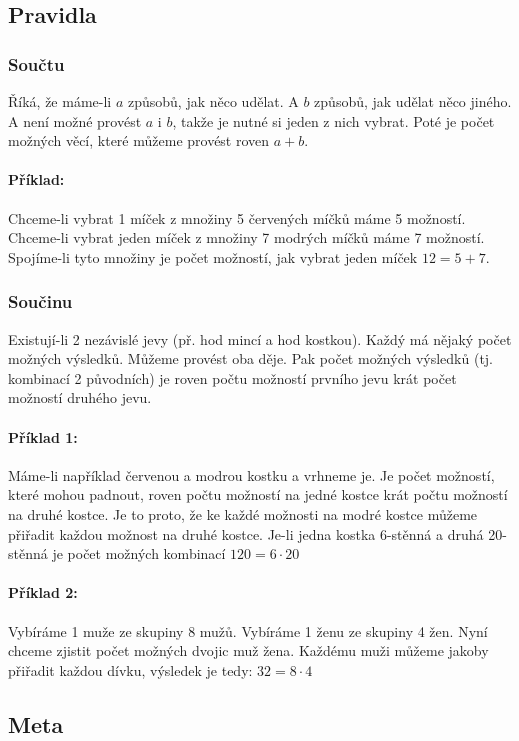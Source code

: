\documentclass[12pt]{article}
\begin{document}
\subsection{Pravidla}
\subsubsection{Součtu}
Říká, že máme-li $a$ způsobů, jak něco udělat. A $b$ způsobů, jak udělat něco jiného. A není možné provést $a$ i $b$, takže je nutné si jeden z nich vybrat. Poté je počet možných věcí, které můžeme provést roven $a+b$.
\paragraph{Příklad: }Chceme-li vybrat 1 míček z množiny 5 červených míčků máme 5 možností. Chceme-li vybrat jeden míček z množiny 7 modrých míčků máme 7 možností. Spojíme-li tyto množiny je počet možností, jak vybrat jeden míček $12=5+7$.
\subsubsection{Součinu}
\label{sec:pravidlo_soucinu}
Existují-li 2 nezávislé jevy (př. hod mincí a hod kostkou). Každý má nějaký počet možných výsledků. Můžeme provést oba děje. Pak počet možných výsledků (tj. kombinací 2 původních) je roven počtu možností prvního jevu krát počet možností druhého jevu.
\paragraph{Příklad 1:} Máme-li například červenou a modrou kostku a vrhneme je. Je počet možností, které mohou padnout, roven počtu možností na jedné kostce krát počtu možností na druhé kostce. Je to proto, že ke každé možnosti na modré kostce můžeme přiřadit každou možnost na druhé kostce. Je-li jedna kostka 6-stěnná a druhá 20-stěnná je počet možných kombinací $120 = 6 \cdot 20$
\paragraph{Příklad 2:} Vybíráme 1 muže ze skupiny 8 mužů. Vybíráme 1 ženu ze skupiny 4 žen. Nyní chceme zjistit počet možných dvojic muž žena. Každému muži můžeme jakoby přiřadit každou dívku, výsledek je tedy: $32 = 8 \cdot 4$

\subsection{Meta}
\end{document}
